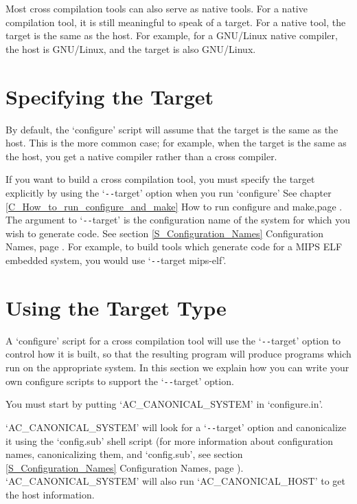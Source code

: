 Most cross compilation tools can also serve as native tools. For a native compilation tool, it is still meaningful to speak of a target. For a native tool, the target is the same as the host. For example, for a GNU/Linux native compiler, the host is GNU/Linux, and the target is also GNU/Linux. 

\section{Specifying the Target}

By default, the `configure' script will assume that the target is the same as the host. This is the more common case; for example, when the target is the same as the host, you get a native compiler rather than a cross compiler.

If you want to build a cross compilation tool, you must specify the target 
explicitly by using the `\verb+--+target' option when you run `configure'
See chapter \ref{C_How_to_run_configure_and_make}
How to run configure and make,page \pageref{C_How_to_run_configure_and_make}.
The argument to `\verb+--+target' is the configuration name of the system for 
which you wish to generate code. See section \ref{S_Configuration_Names}
Configuration Names, page \pageref{S_Configuration_Names}. For example,
to build tools which generate code for a MIPS ELF embedded system,
you would use `\verb+--+target mips-elf'. 

\section{Using the Target Type}\label{S_Using_the_Target_Type}

A `configure' script for a cross compilation tool will use 
the `\verb+--+target' option to control how it is built, so that the 
resulting program will produce programs which run on the appropriate system.
In this section we explain how you can write your own configure scripts to 
support the `\verb+--+target' option.

You must start by putting `AC\_{}CANONICAL\_{}SYSTEM' in `configure.in'.

`AC\_{}CANONICAL\_{}SYSTEM' will look for a `\verb+--+target' option and 
canonicalize it using the `config.sub' shell script (for more information 
about configuration names, canonicalizing them, and `config.sub',
see section \ref{S_Configuration_Names} Configuration Names,
page \pageref{S_Configuration_Names}). `AC\_{}CANONICAL\_{}SYSTEM' will 
also run `AC\_{}CANONICAL\_{}HOST' to get the host information.

